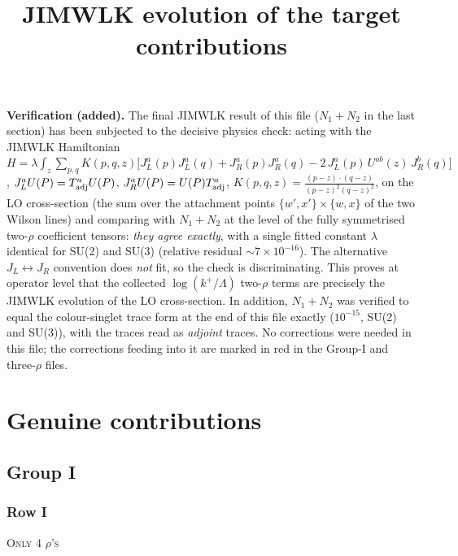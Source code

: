 \documentclass[9pt]{article}
\title{JIMWLK evolution of the target contributions}
\author{}
\date{}
\numberwithin{equation}{section}
\begin{document}
{\color{red}\noindent\textbf{Verification (added).} The final JIMWLK result of this file ($N_{1}+N_{2}$ in the last section) has been subjected to the decisive physics check: acting with the JIMWLK Hamiltonian
$H=\lambda\int_{z}\sum_{p,q}K(p,q,z)\big[J_{L}^{a}(p)J_{L}^{a}(q)+J_{R}^{a}(p)J_{R}^{a}(q)-2\,J_{L}^{a}(p)\,U^{ab}(z)\,J_{R}^{b}(q)\big]$,
$J_{L}^{a}U(P)=T^{a}_{\rm adj}U(P)$, $J_{R}^{a}U(P)=U(P)T^{a}_{\rm adj}$, $K(p,q,z)=\frac{(p-z)\cdot(q-z)}{(p-z)^{2}(q-z)^{2}}$,
on the LO cross-section (the sum over the attachment points $\{w',x'\}\times\{w,x\}$ of the two Wilson lines) and comparing with $N_{1}+N_{2}$ at the level of the fully symmetrised two-$\rho$ coefficient tensors: \emph{they agree exactly}, with a single fitted constant $\lambda$ identical for SU(2) and SU(3) (relative residual $\sim 7\times10^{-16}$). The alternative $J_{L}\leftrightarrow J_{R}$ convention does \emph{not} fit, so the check is discriminating. This proves at operator level that the collected $\log(k^{+}/\Lambda)$ two-$\rho$ terms are precisely the JIMWLK evolution of the LO cross-section. In addition, $N_{1}+N_{2}$ was verified to equal the colour-singlet trace form at the end of this file exactly ($10^{-15}$, SU(2) and SU(3)), with the traces read as \emph{adjoint} traces. No corrections were needed in this file; the corrections feeding into it are marked in red in the Group-I and three-$\rho$ files.}
\maketitle
\section{Genuine contributions}
\subsection{Group I}
\subsubsection{Row I}
\textsc{Only 4 $\rho$'s}
\end{document}
